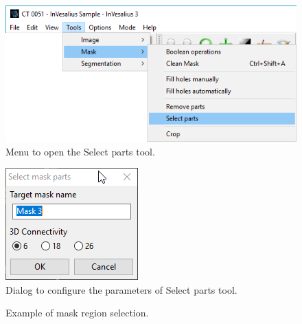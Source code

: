 \begin{figure}[!htb]
\centering
\includegraphics[scale=0.4]{../user_guide_figures/invesalius_screen/menu_mask_select_part_en.png}
\caption{Menu to open the Select parts tool.}
\label{fig:menu_mask_select_part}
\end{figure}

\begin{figure}[!htb]
\centering
\includegraphics[scale=0.7]{../user_guide_figures/invesalius_screen/mask_select_part_en.png}
\caption{Dialog to configure the parameters of Select parts tool.}
\label{fig:mask_select_part}
\end{figure}

\begin{figure}[!htb]
  \centering
    \qquad
  \hfill
  \caption{Example of mask region selection.}
  \label{fig:mask_selected_part}
\end{figure}

